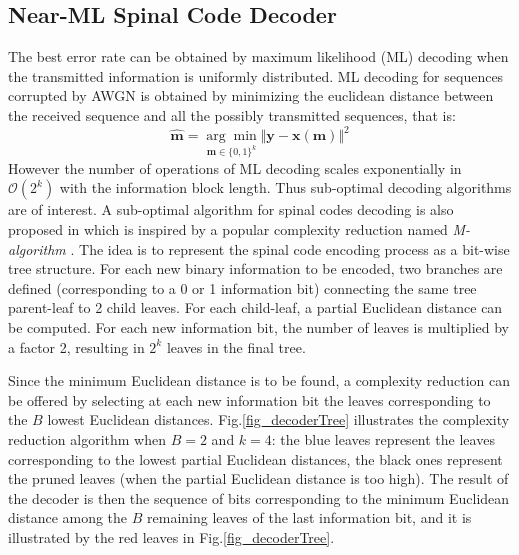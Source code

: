 \documentclass[conference]{IEEEtran}
\begin{document}
\subsection{Near-ML Spinal Code Decoder} \label{sec:nearML}
The best error rate can be obtained by maximum likelihood (ML) decoding when the transmitted information is uniformly distributed.
ML decoding for sequences corrupted by AWGN is obtained by minimizing the euclidean distance between the received sequence and all the possibly transmitted sequences, that is:
\begin{equation}
\widehat{\bm m}=\underset{{\bm m}\in\{0,1\}^k}{\arg\min}\Vert{\bm y}-{\bm x}({\bm m})\Vert^2
\label{equ_ml}
\end{equation}
However the number of operations of ML decoding scales exponentially in $\mathcal{O}(2^k)$ with the information block length. Thus sub-optimal decoding algorithms are of interest. A sub-optimal algorithm for spinal codes decoding is also proposed in \cite{perry2012spinal} which is inspired by a popular complexity reduction named \emph{M-algorithm} \cite{Anderson1984}. The idea is to represent the spinal code encoding process as a bit-wise tree structure. For each new binary information to be encoded, two branches are defined (corresponding to a 0 or 1 information bit) connecting the same tree parent-leaf to 2 child leaves. For each child-leaf, a partial Euclidean distance can be computed. For each new information bit, the number of leaves is multiplied by a factor 2, resulting in $2^k$ leaves in the final tree.

Since the minimum Euclidean distance is to be found, a complexity reduction can be offered by selecting at each new information bit the leaves corresponding to the $B$ lowest Euclidean distances. Fig.\ref{fig_decoderTree} illustrates the complexity reduction algorithm when $B=2$ and $k=4$: the blue leaves represent the leaves corresponding to the lowest partial Euclidean distances, the black ones represent the pruned leaves (when the partial Euclidean distance is too high). The result of the decoder is then the sequence of bits corresponding to the minimum Euclidean distance among the $B$ remaining leaves of the last information bit, and it is illustrated by the red leaves in Fig.\ref{fig_decoderTree}.


 
\end{document}
